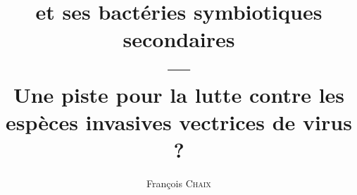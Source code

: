 \usepackage[francais]{babel}
\usepackage{fontspec}
    \setmainfont[%
	Numbers=OldStyle,
	Ligatures={
		TeX,
		Common,
		Rare,
		Historical
		}
	]{Linux Libertine O}
    \setsansfont{Linux Biolinum O}


\usepackage[%
    hidelinks=true
    colorlinks=false
    pdfauthor={François Chaix},
    pdftitle={Document de travail — recherches biblio François Chaix},
    pdfdisplaydoctitle=true, %
    pdfsubject={plop},
    pdfkeywords={plop},
    pdfproducer={LuaTeX, avec le package hyperref},
    pdfcreator={LuaTex},
    linktocpage=false,
    pdfinfo={pouet ?},
    pdflang={fr-FR},
    unicode=true,
    verbose=true
    ]{hyperref}

\usepackage{lipsum}



\usepackage[
	natbib=true,
	backend=biber
	]{biblatex}


\title{ et ses bactéries symbiotiques secondaires \\—\\ \large Une piste pour la lutte contre les espèces invasives vectrices de virus ?}
\author{François \textsc{Chaix}}
